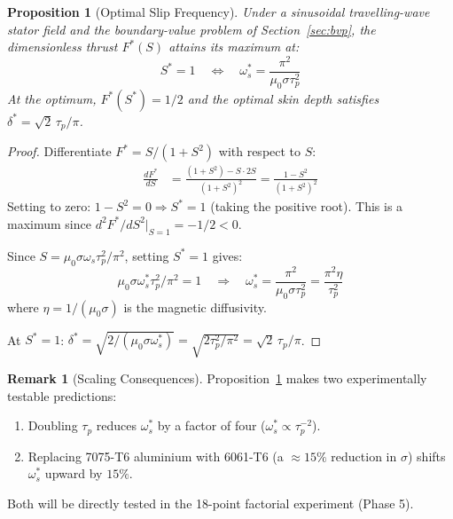 \documentclass[12pt, a4paper]{article}
\theoremstyle{plain}
\newtheorem{proposition}[theorem]{Proposition}
\theoremstyle{definition}
\newtheorem{remark}[theorem]{Remark}
\newcommand{\taup}{\tau_p}
\newcommand{\oms}{\omega_s}
\newcommand{\omstar}{\omega_s^*}
\newcommand{\sig}{\sigma}
\newcommand{\muZ}{\mu_0}
\newcommand{\Fstar}{F^*}
\begin{document}
\begin{proposition}[Optimal Slip Frequency]
\label{prop:optslip}
  Under a sinusoidal travelling-wave stator field and the boundary-value problem
  of Section~\ref{sec:bvp}, the dimensionless thrust $\Fstar(S)$ attains its maximum
  at:
  \begin{equation}
    S^* = 1 \quad \Longleftrightarrow \quad
    \omstar = \frac{\pi^2}{\muZ\sig\taup^2}
    \label{eq:omstar}
  \end{equation}
  At the optimum, $\Fstar(S^*) = 1/2$ and the optimal skin depth satisfies
  $\delta^* = \sqrt{2}\,\taup/\pi$.
\end{proposition}

\begin{proof}
  Differentiate $\Fstar = S/(1+S^2)$ with respect to $S$:
  \begin{align}
    \frac{d\Fstar}{dS}
    &= \frac{(1+S^2) - S\cdot 2S}{(1+S^2)^2}
     = \frac{1 - S^2}{(1+S^2)^2}
    \label{eq:dFstar}
  \end{align}
  Setting to zero: $1 - S^2 = 0 \Rightarrow S^* = 1$ (taking the positive root).
  This is a maximum since $d^2\Fstar/dS^2\big|_{S=1} = -1/2 < 0$.

  Since $S = \muZ\sig\oms\taup^2/\pi^2$, setting $S^* = 1$ gives:
  \begin{equation}
    \muZ\sig\omstar\taup^2/\pi^2 = 1
    \quad \Longrightarrow \quad
    \omstar = \frac{\pi^2}{\muZ\sig\taup^2} = \frac{\pi^2\eta}{\taup^2}
  \end{equation}
  where $\eta = 1/(\muZ\sig)$ is the magnetic diffusivity.

  At $S^* = 1$: $\delta^* = \sqrt{2/(\muZ\sig\omstar)} = \sqrt{2\taup^2/\pi^2}
  = \sqrt{2}\,\taup/\pi$.
\end{proof}

\begin{remark}[Scaling Consequences]
  Proposition~\ref{prop:optslip} makes two experimentally testable predictions:
  \begin{enumerate}
    \item Doubling $\taup$ reduces $\omstar$ by a factor of four ($\omstar \propto \taup^{-2}$).
    \item Replacing 7075-T6 aluminium with 6061-T6 (a $\approx 15\%$ reduction in $\sig$)
          shifts $\omstar$ upward by $15\%$.
  \end{enumerate}
  Both will be directly tested in the 18-point factorial experiment (Phase 5).
\end{remark}
\end{document}
